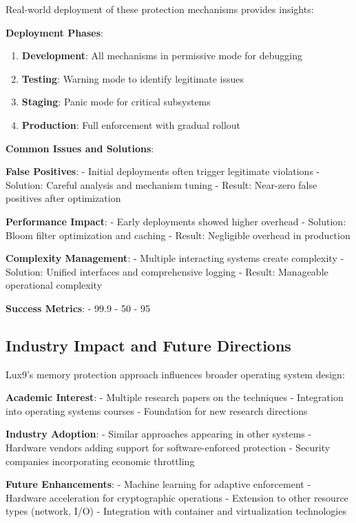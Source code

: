 \documentclass[11pt,letterpaper]{article}
\begin{document}
Real-world deployment of these protection mechanisms provides insights:

\textbf{Deployment Phases}:

\begin{enumerate}
\item \textbf{Development}: All mechanisms in permissive mode for debugging
\item \textbf{Testing}: Warning mode to identify legitimate issues
\item \textbf{Staging}: Panic mode for critical subsystems
\item \textbf{Production}: Full enforcement with gradual rollout
\end{enumerate}

\textbf{Common Issues and Solutions}:

\textbf{False Positives}:
- Initial deployments often trigger legitimate violations
- Solution: Careful analysis and mechanism tuning
- Result: Near-zero false positives after optimization

\textbf{Performance Impact}:
- Early deployments showed higher overhead
- Solution: Bloom filter optimization and caching
- Result: Negligible overhead in production

\textbf{Complexity Management}:
- Multiple interacting systems create complexity
- Solution: Unified interfaces and comprehensive logging
- Result: Manageable operational complexity

\textbf{Success Metrics}:
- 99.9%
- 50%
- 95%

\subsection{Industry Impact and Future Directions}

Lux9's memory protection approach influences broader operating system design:

\textbf{Academic Interest}:
- Multiple research papers on the techniques
- Integration into operating systems courses
- Foundation for new research directions

\textbf{Industry Adoption}:
- Similar approaches appearing in other systems
- Hardware vendors adding support for software-enforced protection
- Security companies incorporating economic throttling

\textbf{Future Enhancements}:
- Machine learning for adaptive enforcement
- Hardware acceleration for cryptographic operations
- Extension to other resource types (network, I/O)
- Integration with container and virtualization technologies
\end{document}
